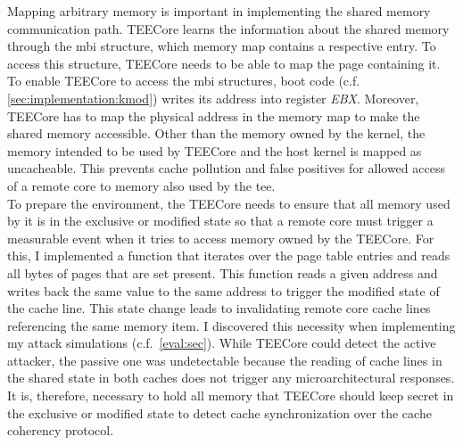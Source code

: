 Mapping arbitrary memory is important in implementing the shared memory
communication path. TEECore learns the information about the shared memory
through the \gls{mbi} structure, which memory map contains a
respective entry. To access this structure, TEECore needs to be able to map the
page containing it. To enable TEECore to access the \gls{mbi}
structures, boot code (c.f. \ref{sec:implementation:kmod}) writes its address
into register \textit{EBX}. Moreover, TEECore has to map the physical address in
the memory map to make the shared memory accessible. Other than the memory owned
by the kernel, the memory intended to be used by TEECore and the host kernel is
mapped as uncacheable. This prevents cache pollution and false positives for
allowed access of a remote core to memory also used by the \gls{tee}.\\

To prepare the environment, the TEECore needs to ensure that all memory used by
it is in the exclusive or modified state so that a remote core must trigger a
measurable event when it tries to access memory owned by the TEECore. For this,
I implemented a function that iterates over the page table entries and reads all
bytes of pages that are set present. This function reads a given address and
writes back the same value to the same address to trigger the modified state of
the cache line. This state change leads to invalidating remote core cache lines
referencing the same memory item. I discovered this necessity when implementing
my attack simulations (c.f.~\ref{eval:sec}). While TEECore could detect the
active attacker, the passive one was undetectable because the reading of cache
lines in the shared state in both caches does not trigger any microarchitectural
responses. It is, therefore, necessary to hold all memory that TEECore should
keep secret in the exclusive or modified state to detect cache synchronization
over the cache coherency protocol.\\

